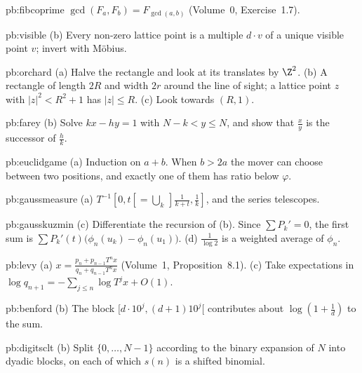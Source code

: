 \begin{hint}{pb:fibcoprime}
$\gcd(F_a,F_b)=F_{\gcd(a,b)}$ (Volume~0, Exercise~1.7).
\end{hint}

\begin{hint}{pb:visible}
(b) Every non-zero lattice point is a multiple $d\cdot v$ of a unique visible point $v$; invert with Möbius.
\end{hint}

\begin{hint}{pb:orchard}
(a) Halve the rectangle and look at its translates by $\Z^2$. (b) A rectangle of length $2R$ and width $2r$ around the line
of sight; a lattice point $z$ with $|z|^2<R^2+1$ has $|z|\le R$. (c) Look towards $(R,1)$.
\end{hint}

\begin{hint}{pb:farey}
(b) Solve $kx-hy=1$ with $N-k<y\le N$, and show that $\frac xy$ is the successor of $\frac hk$.
\end{hint}

\begin{hint}{pb:euclidgame}
(a) Induction on $a+b$. When $b>2a$ the mover can choose between two positions, and exactly one of them has ratio below
$\varphi$.
\end{hint}

\begin{hint}{pb:gaussmeasure}
(a) $T^{-1}[0,t[=\bigcup_k\,]\frac1{k+t},\frac1k]$, and the series telescopes.
\end{hint}

\begin{hint}{pb:gausskuzmin}
(c) Differentiate the recursion of (b). Since $\sum P_k'=0$, the first sum is $\sum P_k'(t)\bigl(\phi_n(u_k)-\phi_n(u_1)\bigr)$.
(d) $\frac1{\log2}$ is a weighted average of $\phi_n$.
\end{hint}

\begin{hint}{pb:levy}
(a) $x=\frac{p_n+p_{n-1}T^nx}{q_n+q_{n-1}T^nx}$ (Volume~1, Proposition~8.1). (c) Take expectations in $\log q_{n+1}=-\sum_{j\le n}\log T^jx+O(1)$.
\end{hint}

\begin{hint}{pb:benford}
(b) The block $[d\cdot10^j,(d+1)10^j[$ contributes about $\log(1+\frac1d)$ to the sum.
\end{hint}

\begin{hint}{pb:digitsclt}
(b) Split $\{0,\dots,N-1\}$ according to the binary expansion of $N$ into dyadic blocks, on each of which $s(n)$ is a shifted
binomial.
\end{hint}

